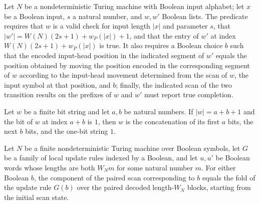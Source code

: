 \begin{definition}
\label{Complexity.Codec.StepChk}
\leanok
{}
Let $N$ be a nondeterministic Turing machine with Boolean input alphabet; let $x$ be a
Boolean input, $s$ a natural number, and $w,w'$ Boolean lists. The predicate requires
that $w$ is a valid check for input length $|x|$ and parameter $s$, that
$|w'|=W(N)(2s+1)+w_P(|x|)+1$, and that the entry of $w'$ at index $W(N)(2s+1)+w_P(|x|)$
is true. It also requires a Boolean choice $b$ such that the encoded input-head position
in the indicated segment of $w'$ equals the position obtained by moving the position
encoded in the corresponding segment of $w$ according to the input-head movement
determined from the scan of $w$, the input symbol at that position, and $b$; finally,
the indicated scan of the two transition results on the prefixes of $w$ and $w'$ must
report true completion.
\end{definition}

\begin{lemma}
\label{Complexity.Codec.word_split}
\leanok
{}
Let $w$ be a finite bit string and let $a,b$ be natural numbers. If $|w|=a+b+1$ and the
bit of $w$ at index $a+b$ is $1$, then $w$ is the concatenation of its first $a$ bits,
the next $b$ bits, and the one-bit string $1$.
\end{lemma}

\begin{lemma}
\label{Complexity.Codec.sScan_sel}
\leanok
{}
Let $N$ be a finite nondeterministic Turing machine over Boolean symbols, let $G$ be a
family of local update rules indexed by a Boolean, and let $u,u'$ be Boolean words whose
lengths are both $W_Nm$ for some natural number $m$. For either Boolean $b$, the
component of the paired scan corresponding to $b$ equals the fold of the update rule
$G(b)$ over the paired decoded length-$W_N$ blocks, starting from the initial scan
state.
\end{lemma}

